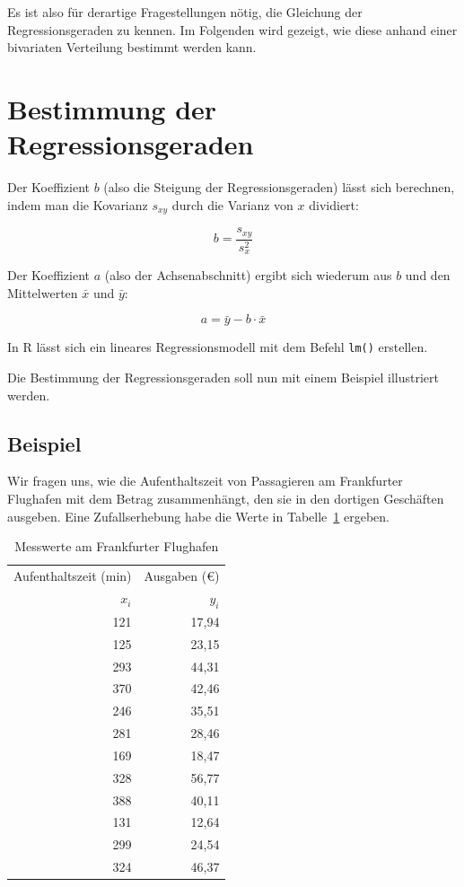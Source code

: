\documentclass[
  11pt,
  ngerman,
  a4paper,
]{report}
\newenvironment{rtip}{
  \medskip
  \begin{tcolorbox}[colframe=purple,colback=light_gray,title=Softwarehinweis]
}{
  \end{tcolorbox}
  \medskip
}
\begin{document}
Es ist also für derartige Fragestellungen nötig, die Gleichung der Regressionsgeraden zu kennen. Im Folgenden wird gezeigt, wie diese anhand einer bivariaten Verteilung bestimmt werden kann.

\hypertarget{bestimmung-der-regressionsgeraden}{%
\section{Bestimmung der Regressionsgeraden}\label{bestimmung-der-regressionsgeraden}}

Der Koeffizient \(b\) (also die Steigung der Regressionsgeraden) lässt sich berechnen, indem man die Kovarianz \(s_{xy}\) durch die Varianz von \(x\) dividiert:

\[
b=\frac{s_{xy}}{s^2_x}
\label{eq:b}
\]

Der Koeffizient \(a\) (also der Achsenabschnitt) ergibt sich wiederum aus \(b\) und den Mittelwerten \(\bar{x}\) und \(\bar{y}\):

\nopagebreak

\[
a=\bar{y}-b\cdot\bar{x}
\label{eq:a}
\]

\begin{rtip}
In R lässt sich ein lineares Regressionsmodell mit dem Befehl \verb|lm()| erstellen.
\end{rtip}

Die Bestimmung der Regressionsgeraden soll nun mit einem Beispiel illustriert werden.

\hypertarget{beispiel-26}{%
\subsection{Beispiel}\label{beispiel-26}}

Wir fragen uns, wie die Aufenthaltszeit von Passagieren am Frankfurter Flughafen mit dem Betrag zusammenhängt, den sie in den dortigen Geschäften ausgeben. Eine Zufallserhebung habe die Werte in Tabelle~\ref{tab:duty1} ergeben.

\begin{table}

\caption{\label{tab:duty1}Messwerte am Frankfurter Flughafen}
\centering
\begin{tabular}[t]{rr}
\toprule
\multicolumn{1}{c}{Aufenthaltszeit (min)} & \multicolumn{1}{c}{Ausgaben (€)} \\
\cmidrule(l{3pt}r{3pt}){1-1} \cmidrule(l{3pt}r{3pt}){2-2}
$x_i$ & $y_i$\\
\midrule
121 & 17,94\\
125 & 23,15\\
293 & 44,31\\
370 & 42,46\\
246 & 35,51\\
281 & 28,46\\
169 & 18,47\\
328 & 56,77\\
388 & 40,11\\
131 & 12,64\\
299 & 24,54\\
324 & 46,37\\
\bottomrule
\end{tabular}
\end{table}
\end{document}
